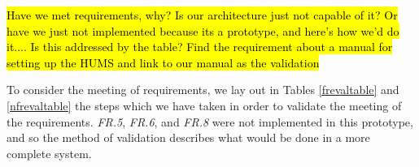 \documentclass[10pt,a4paper]{article}
\begin{document}

\hl{Have we met requirements, why? Is our architecture just not capable of it? Or have we just not implemented because its a prototype, and here's how we'd do it.... Is this addressed by the table? Find the requirement about a manual for setting up the HUMS and link to our manual as the validation}

To consider the meeting of requirements, we lay out in Tables \ref{frevaltable} and \ref{nfrevaltable} the steps which we have taken in order to validate the meeting of the requirements. \emph{FR.5}, \emph{FR.6}, and \emph{FR.8} were not implemented in this prototype, and so the method of validation describes what would be done in a more complete system.
\end{document}

